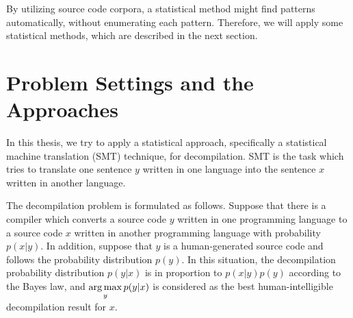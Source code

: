 \documentclass[senior,final,11pt]{iscs-thesis}
\newcommand{\argmax}{\mathop{\rm arg\,max}\limits}
\begin{document}
By utilizing source code corpora, a statistical method might find patterns automatically, without enumerating each pattern.
Therefore, we will apply some statistical methods, which are described in the next section.















\section{Problem Settings and the Approaches}

In this thesis, we try to apply a statistical approach, specifically a statistical machine translation (SMT) technique, for decompilation.
SMT is the task which tries to translate one sentence $y$ written in one language into the sentence $x$ written in another language.

The decompilation problem is formulated as follows. 
Suppose that there is a compiler which converts a source code $ y $ written in one programming language 
to a source code $ x $  written in another programming language with probability $p(x|y)$.
In addition, suppose that $ y $ is a human-generated source code and follows the probability distribution $ p(y) $.
In this situation, the decompilation probability distribution $ p(y|x) $ is in proportion to $ p(x|y)p(y) $ according to the Bayes law, 
and $\argmax_{y} p(y|x)$ is considered as the best human-intelligible decompilation result for $x$.
\end{document}
